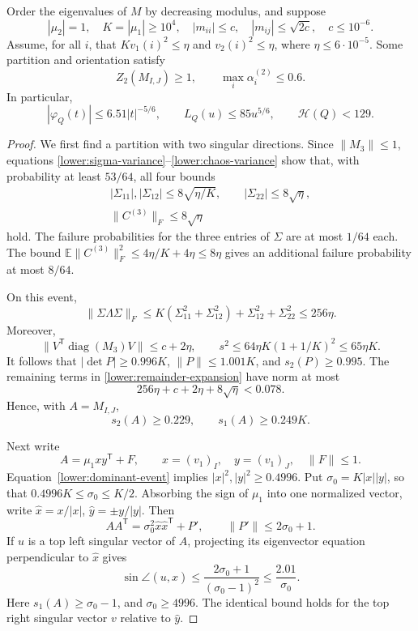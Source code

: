 \begin{lemma}\label{lower:dominant}
Order the eigenvalues of $M$ by decreasing modulus, and suppose
\[
 |\mu_2|=1,\quad K=|\mu_1|\geq10^4,\quad
 |m_{ii}|\leq c,\quad |m_{ij}|\leq\sqrt{2c},\quad c\leq10^{-6}.
\]
Assume, for all $i$, that
$K v_1(i)^2\leq\eta$ and $v_2(i)^2\leq\eta$, where
$\eta\leq6\cdot10^{-5}$.  Some partition and orientation satisfy
\[
 Z_2(M_{I,J})\geq1,
 \qquad \max_i\alpha_i^{(2)}\leq0.6.
\]
In particular,
\[
 |\varphi_Q(t)|\leq6.51|t|^{-5/6},\qquad
 L_Q(u)\leq85u^{5/6},\qquad \mathcal H(Q)<129.
\]
\end{lemma}
\begin{proof}
We first find a partition with two singular directions.
Since $\|M_3\|\leq1$, equations
\eqref{lower:sigma-variance}--\eqref{lower:chaos-variance} show
that, with probability at least $53/64$, all four bounds
\begin{equation}\label{lower:dominant-event}
 \begin{gathered}
 |\Sigma_{11}|,|\Sigma_{12}|\leq8\sqrt{\eta/K},
 \qquad |\Sigma_{22}|\leq8\sqrt\eta,\\
 \|C^{(3)}\|_F\leq8\sqrt\eta
 \end{gathered}
\end{equation}
hold.  The failure probabilities for the three entries of $\Sigma$
are at most $1/64$ each.  The bound
$\mathbb E\|C^{(3)}\|_F^2\leq4\eta/K+4\eta\leq8\eta$
gives an additional failure probability at most $8/64$.

On this event,
\[
 \|\Sigma\Lambda\Sigma\|_F
 \leq K(\Sigma_{11}^2+\Sigma_{12}^2)
               +\Sigma_{12}^2+\Sigma_{22}^2\leq256\eta.
\]
Moreover,
\[
 \|V^{\mathsf T}\operatorname{diag}(M_3)V\|
 \leq c+2\eta,
 \qquad
 s^2\leq64\eta K(1+1/K)^2\leq65\eta K.
\]
It follows that $|\det P|\geq0.996K$, $\|P\|\leq1.001K$,
and $s_2(P)\geq0.995$.  The remaining terms in
\eqref{lower:remainder-expansion} have norm at most
\[
 256\eta+c+2\eta+8\sqrt\eta<0.078.
\]
Hence, with $A=M_{I,J}$,
\begin{equation}\label{lower:dominant-singular}
 s_2(A)\geq0.229,
 \qquad s_1(A)\geq0.249K.
\end{equation}

Next write
\[
 A=\mu_1xy^{\mathsf T}+F,
 \qquad x=(v_1)_I,\quad y=(v_1)_J,\quad \|F\|\leq1.
\]
Equation~\eqref{lower:dominant-event} implies
$|x|^2,|y|^2\geq0.4996$.  Put
$\sigma_0=K|x||y|$, so that
$0.4996K\leq\sigma_0\leq K/2$.
Absorbing the sign of $\mu_1$ into one normalized vector, write
$\widehat x=x/|x|$, $\widehat y=\pm y/|y|$.
Then
\[
 AA^{\mathsf T}=\sigma_0^2\widehat x\widehat x^{\mathsf T}+P',
 \qquad \|P'\|\leq2\sigma_0+1.
\]
If $u$ is a top left singular vector of $A$, projecting its
eigenvector equation perpendicular to $\widehat x$ gives
\[
 \sin\angle(u,\widehat x)
 \leq\frac{2\sigma_0+1}{(\sigma_0-1)^2}
 \leq\frac{2.01}{\sigma_0}.
\]
Here $s_1(A)\geq\sigma_0-1$, and $\sigma_0\geq4996$.
The identical bound holds for the top right singular vector $v$
relative to $\widehat y$.


\end{proof}
